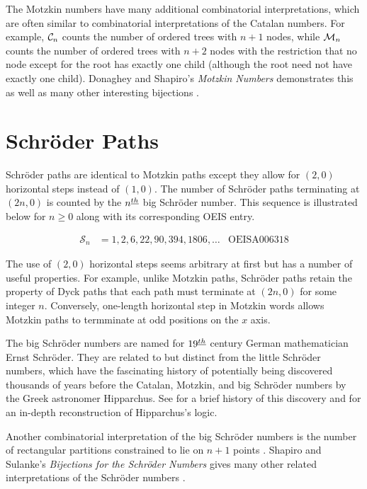 The Motzkin numbers have many additional combinatorial interpretations, which are often similar to combinatorial interpretations of the Catalan numbers.  For example, $\mathcal{C}_n$ counts the number of ordered trees with $n+1$ nodes, while $\mathcal{M}_n$ counts the number of ordered trees with $n+2$ nodes with the restriction that no node except for the root has exactly one child (although the root need not have exactly one child). Donaghey and Shapiro's \emph{Motzkin Numbers} demonstrates this as well as many other interesting bijections \cite{donaghey1977motzkin}.

\section{Schröder Paths}\label{sec:schroder}

Schröder paths are identical to Motzkin paths except they allow for $(2,0)$ horizontal steps instead of $(1,0)$.  The number of Schröder paths terminating at $(2n,0)$ is counted by the $n^{\underline{th}}$ big Schröder number.  This sequence is illustrated below for $n \ge 0$ along with its corresponding OEIS entry.

\begin{align}
\mathcal{S}_n &= 1, 2, 6, 22, 90, 394, 1806, \ldots & \text{OEIS} \text{A}006318
\end{align}

The use of $(2,0)$ horizontal steps seems arbitrary at first but has a number of useful properties.  For example, unlike Motzkin paths, Schröder paths retain the property of Dyck paths that each path must terminate at $(2n,0)$ for some integer $n$.  Conversely, one-length horizontal step in Motzkin words allows Motzkin paths to termminate at odd positions on the $x$ axis.  

The big Schröder numbers are named for $19^{\underline{th}}$ century German mathematician Ernst Schröder.  They are related to but distinct from the little Schröder numbers, which have the fascinating history of potentially being discovered thousands of years before the Catalan, Motzkin, and big Schröder numbers by the Greek astronomer Hipparchus.  See \cite{stanley1997hipparchus} for a brief history of this discovery and \cite{bobzien2011combinatorics} for an in-depth reconstruction of Hipparchus's logic. 

Another combinatorial interpretation of the big Schröder numbers is the number of rectangular partitions constrained to lie on $n+1$ points \cite{ackerman2004number}.  Shapiro and Sulanke's \emph{Bijections for the Schröder Numbers} gives many other related interpretations of the Schröder numbers \cite{shapiro2000bijections}.

